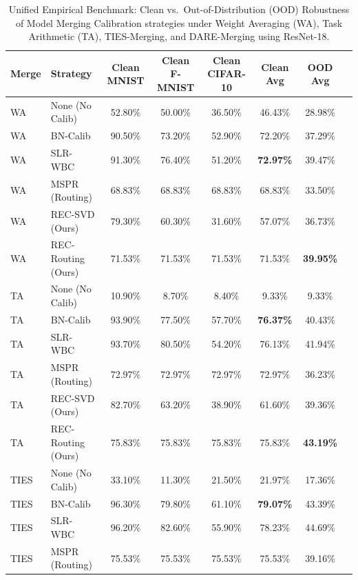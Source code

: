 \documentclass{article}
\theoremstyle{plain}
\theoremstyle{definition}
\theoremstyle{remark}
\begin{document}
\begin{table}[t]
\caption{Unified Empirical Benchmark: Clean vs.\ Out-of-Distribution (OOD) Robustness of Model Merging Calibration strategies under Weight Averaging (WA), Task Arithmetic (TA), TIES-Merging, and DARE-Merging using ResNet-18.}
\label{tab:summary}
\vskip 0.06in
\begin{center}
\begin{small}
\begin{sc}
\begin{tabular}{llcccccr}
\toprule
Merge & Strategy & Clean MNIST & Clean F-MNIST & Clean CIFAR-10 & Clean Avg & OOD Avg \\
\midrule
WA & None (No Calib)  & 52.80\% & 50.00\% & 36.50\% & 46.43\% & 28.98\% \\
WA & BN-Calib         & 90.50\% & 73.20\% & 52.90\% & 72.20\% & 37.29\% \\
WA & SLR-WBC          & 91.30\% & 76.40\% & 51.20\% & \textbf{72.97\%} & 39.47\% \\
WA & MSPR (Routing)   & 68.83\% & 68.83\% & 68.83\% & 68.83\% & 33.50\% \\
WA & REC-SVD (Ours)   & 79.30\% & 60.30\% & 31.60\% & 57.07\% & 36.73\% \\
WA & REC-Routing (Ours) & 71.53\% & 71.53\% & 71.53\% & 71.53\% & \textbf{39.95\%} \\
\midrule
TA & None (No Calib)  & 10.90\% & 8.70\%  & 8.40\%  & 9.33\%  & 9.33\%  \\
TA & BN-Calib         & 93.90\% & 77.50\% & 57.70\% & \textbf{76.37\%} & 40.43\% \\
TA & SLR-WBC          & 93.70\% & 80.50\% & 54.20\% & 76.13\% & 41.94\% \\
TA & MSPR (Routing)   & 72.97\% & 72.97\% & 72.97\% & 72.97\% & 36.23\% \\
TA & REC-SVD (Ours)   & 82.70\% & 63.20\% & 38.90\% & 61.60\% & 39.36\% \\
TA & REC-Routing (Ours) & 75.83\% & 75.83\% & 75.83\% & 75.83\% & \textbf{43.19\%} \\
\midrule
TIES & None (No Calib) & 33.10\% & 11.30\% & 21.50\% & 21.97\% & 17.36\% \\
TIES & BN-Calib        & 96.30\% & 79.80\% & 61.10\% & \textbf{79.07\%} & 43.39\% \\
TIES & SLR-WBC         & 96.20\% & 82.60\% & 55.90\% & 78.23\% & 44.69\% \\
TIES & MSPR (Routing)  & 75.53\% & 75.53\% & 75.53\% & 75.53\% & 39.16\% \\

\end{tabular}
\end{sc}
\end{small}
\end{center}
\end{table}
\end{document}
